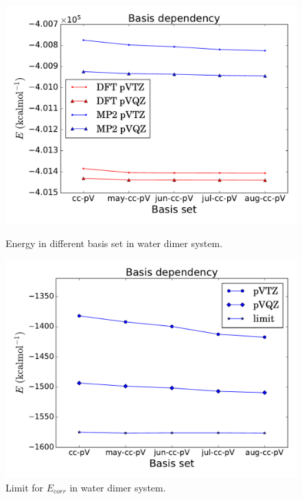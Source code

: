 \begin{figure}[h]
    \begin{minipage}[t]{0.48\textwidth}
      \centering
      \includegraphics[width=\textwidth]{4/plots/basis/dimer_basis.pdf}
      \caption{Energy in different basis set in water dimer system.}
      \label{calendar_limit}
    \end{minipage}%
    \hfill
    \begin{minipage}[t]{0.48\textwidth}
      \centering
      \includegraphics[width=1\textwidth]{4/plots/basis/limit_basis.pdf}
      \caption{Limit for $E_{corr}$ in water dimer system.}
      \label{limit_MP2}
    \end{minipage}%
\end{figure}

